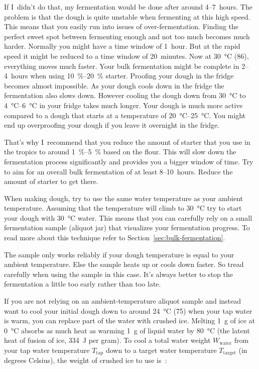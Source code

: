 If I~didn't do that, my fermentation would be done after
around 4--7~hours. The problem is that the dough is quite
unstable when fermenting at this high speed. This means
that you easily run into issues of over-fermentation.
Finding the perfect sweet spot between fermenting enough
and not too much becomes much harder. Normally you might
have a time window of 1~hour. But at the rapid speed it
might be reduced to a time window of 20~minutes. Now at
\qty{30}{\degreeCelsius} (\qty{86}{\degF}), everything moves much faster. Your
bulk fermentation might be complete in 2--4~hours when using
\qtyrange{10}{20}{\percent} starter. Proofing your dough in the fridge becomes
almost impossible. As your dough cools down in the fridge the fermentation
also slows down. However cooling the dough down from \qty{30}{\degreeCelsius}
to \qtyrange{4}{6}{\degreeCelsius} in your fridge takes much longer. Your
dough is much more active compared to a dough that starts at a temperature of
\qtyrange{20}{25}{\degreeCelsius}. You might end up overproofing your dough if
you leave it overnight in the fridge.

That's why I~recommend that you reduce the amount of starter
that you use in the tropics to around \qtyrange{1}{5}{\percent}
based on the flour. This will slow down the fermentation
process significantly and provides you a bigger window
of time. Try to aim for an overall bulk fermentation of at
least 8--10~hours. Reduce the amount of starter to get there.

When making dough, try to use the same water temperature
as your ambient temperature. Assuming that the temperature
will climb to \qty{30}{\degreeCelsius} try to start your dough
with \qty{30}{\degreeCelsius} water. This means that you can carefully rely on
a small fermentation sample (aliquot jar) that visualizes your fermentation
progress. To read more about this technique refer
to Section~\ref{sec:bulk-fermentation}.

The sample only works reliably if your dough temperature
is equal to your ambient temperature. Else the sample heats
up or cools down faster. So tread carefully when using
the sample in this case. It's always better to stop
the fermentation a little too early rather than too late.

If you are not relying on an ambient-temperature aliquot sample and instead
want to cool your initial dough down to around \qty{24}{\degreeCelsius}
(\qty{75}{\degF}) when your tap water is warm, you can replace part of the
water with crushed ice. Melting \qty{1}{\gram} of ice at
\qty{0}{\degreeCelsius} absorbs as much heat as warming \qty{1}{\gram} of
liquid water by \qty{80}{\degreeCelsius} (the latent heat of fusion of ice,
334~J per gram). To cool a total water weight $W_{\mathrm{water}}$ from your
tap water temperature $T_{\mathrm{tap}}$ down to a target water temperature
$T_{\mathrm{target}}$ (in degrees Celsius), the weight of crushed ice to use
is~\cite{sourdoughcalc+ice+ddt}:

